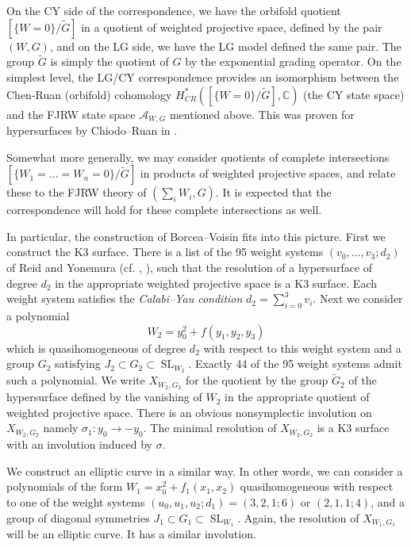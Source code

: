 \documentclass[10pt, letterpaper]{amsart}
\theoremstyle{remark}
\newcommand{\CC}{\mathbb C}
\newcommand{\sA}{\mathscr{A}}
\DeclareMathOperator{\SL}{SL}
\begin{document}
On the CY side of the correspondence, we have the orbifold quotient $[\{W = 0\}/\widetilde{G}]$ in a quotient of weighted projective space, defined by the pair $(W,G)$, and on the LG side, we have the LG model defined the same pair. The group $\widetilde{G}$ is simply the quotient of $G$ by the exponential grading operator. On the simplest level, the LG/CY correspondence provides an isomorphism between the Chen-Ruan (orbifold) cohomology $H^*_{CR}([\{W = 0\}/\widetilde{G}], \CC)$ (the CY state space) and the FJRW state space $\sA_{W,G}$ mentioned above. This was proven for hypersurfaces by Chiodo--Ruan in \cite{ChR}. 

Somewhat more generally, we may consider quotients of complete intersections $[\{W_1 = \ldots = W_n = 0\}/\widetilde G]$ in products of weighted projective spaces, and relate these to the FJRW theory of $(\sum_i W_i, G)$. It is expected that the correspondence will hold for these complete intersections as well. 

In particular, the construction of Borcea--Voisin fits into this picture. First we construct the K3 surface. There is a list of the 95 weight systems $(v_0,\dots,v_3;d_2)$ of Reid and Yonemura (cf. \cite{Re}, \cite{Yo}), such that the resolution of a hypersurface of degree $d_2$ in the appropriate weighted projective space is a K3 surface. Each weight system satisfies the \emph{Calabi--Yau condition} $d_2=\sum_{i=0}^3 v_i$. Next we consider a polynomial 
\begin{equation}\label{e:Wform}
W_2=y_0^2+f(y_1,y_2,y_3) 
\end{equation}
which is quasihomogeneous of degree $d_2$ with respect to this weight system and a group $G_2$ satisfying $J_2\subset G_2\subset \SL_{W_2}$. Exactly 44 of the 95 weight systems admit such a polynomial. We write $X_{W_2,G_2}$ for the quotient by the group $\widetilde{G}_2$ of the hypersurface defined by the vanishing of $W_2$ in the appropriate quotient of weighted projective space. There is an obvious nonsymplectic involution on $X_{W_2,G_2}$ namely $\sigma_1:y_0\to -y_0$. The minimal resolution of $X_{W_2,G_2}$ is a K3 surface with an involution induced by $\sigma$. 

We construct an elliptic curve in a similar way. In other words, we can consider a polynomials of the form $W_1=x_0^2+f_1(x_1,x_2)$ quasihomogeneous with respect to one of the weight systems $(u_0,u_1,u_2;d_1)=(3,2,1;6)$ or $(2,1,1;4)$, and a group of diagonal symmetries $J_1\subset G_1\subset \SL_{W_1}$. Again, the resolution of $X_{W_1,G_1}$ will be an elliptic curve. It has a similar involution. 
\end{document}
